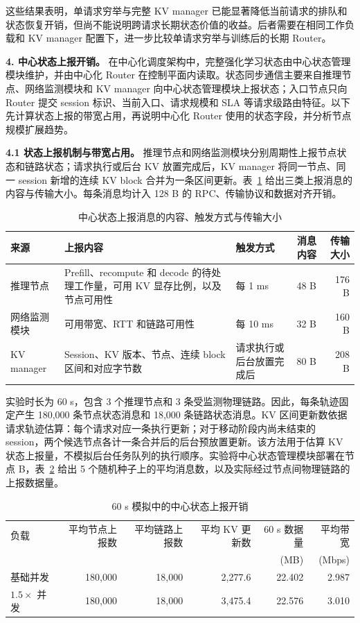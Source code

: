 这些结果表明，单请求穷举与完整 KV manager 已能显著降低当前请求的排队和状态恢复开销，但尚不能说明跨请求长期状态价值的收益。后者需要在相同工作负载和 KV manager 配置下，进一步比较单请求穷举与训练后的长期 Router。

\medskip
\noindent\textbf{4. 中心状态上报开销。}
在中心化调度架构中，完整强化学习状态由中心状态管理模块维护，并由中心化 Router 在控制平面内读取。状态同步通信主要来自推理节点、网络监测模块和 KV manager 向中心状态管理模块上报状态；入口节点只向 Router 提交 session 标识、当前入口、请求规模和 SLA 等请求级路由特征。以下先计算状态上报的带宽占用，再说明中心化 Router 使用的状态字段，并分析节点规模扩展趋势。

\textbf{4.1 状态上报机制与带宽占用。}
推理节点和网络监测模块分别周期性上报节点状态和链路状态；请求执行或后台 KV 放置完成后，KV manager 将同一节点、同一 session 新增的连续 KV block 合并为一条区间更新。表~\ref{tab:control-plane-message-size} 给出三类上报消息的内容与传输大小。每条消息均计入 128 B 的 RPC、传输协议和数据对齐开销。

\begin{table}[H]
\centering
\footnotesize
\caption{中心状态上报消息的内容、触发方式与传输大小}
\label{tab:control-plane-message-size}
\begin{tabular}{@{}p{}p{}p{}rr@{}}
\toprule
来源 & 上报内容 & 触发方式 & 消息内容 & 传输大小 \\
\midrule
推理节点
& Prefill、recompute 和 decode 的待处理工作量，可用 KV 显存比例，以及节点可用性
& 每 1 ms
& 48 B & 176 B \\
网络监测模块
& 可用带宽、RTT 和链路可用性
& 每 10 ms
& 32 B & 160 B \\
KV manager
& Session、KV 版本、节点、连续 block 区间和对应字节数
& 请求执行或后台放置完成后
& 80 B & 208 B \\
\bottomrule
\end{tabular}
\end{table}

实验时长为 60 s，包含 3 个推理节点和 3 条受监测物理链路。因此，每条轨迹固定产生 180,000 条节点状态消息和 18,000 条链路状态消息。KV 区间更新数依据请求轨迹估算：每个请求对应一条执行更新；对于移动阶段内尚未结束的 session，两个候选节点各计一条合并后的后台预放置更新。该方法用于估算 KV 状态上报量，不模拟后台任务队列的执行顺序。实验将中心状态管理模块部署在节点 B，表~\ref{tab:control-plane-upload-results} 给出 5 个随机种子上的平均消息数，以及实际经过节点间物理链路的上报数据量。

\begin{table}[H]
\centering
\small
\caption{60 s 模拟中的中心状态上报开销}
\label{tab:control-plane-upload-results}
\begin{tabular}{@{}lrrrrr@{}}
\toprule
负载
& 平均节点上报数
& 平均链路上报数
& 平均 KV 更新数
& 60 s 数据量
& 平均带宽 \\
&
&
&
&
(MB)
& (Mbps) \\
\midrule
基础并发
& 180,000 & 18,000 & 2,277.6 & 22.402 & 2.987 \\
\(1.5\times\) 并发
& 180,000 & 18,000 & 3,475.4 & 22.576 & 3.010 \\
\bottomrule
\end{tabular}
\end{table}

